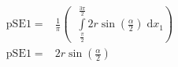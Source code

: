 \begin{align}
    \mathrm{pSE1} =&\frac{1}{\pi} \left(\;\;\int\limits_{\frac{\pi}{2}}^{\frac{3 \pi}{2}}2 r \sin{\left (\frac{\alpha}{2} \right )}\;\mathrm{d}x_{1}\right)\label{pSE1Def}\\
    \mathrm{pSE1} =& 2 r \sin{\left (\frac{\alpha}{2} \right )}\label{pSE1Sln}
\end{align}